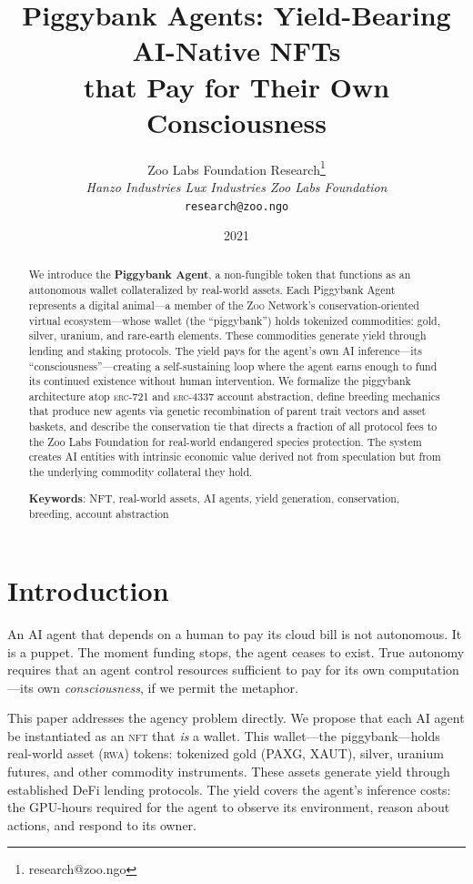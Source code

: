 \documentclass[11pt,letterpaper]{article}
\title{\textbf{Piggybank Agents: Yield-Bearing AI-Native NFTs\\that Pay for Their Own Consciousness}}
\author{
Zoo Labs Foundation Research\thanks{research@zoo.ngo}\\
\textit{Hanzo Industries \quad Lux Industries \quad Zoo Labs Foundation}\\
\texttt{research@zoo.ngo}
}
\date{2021}
\newcommand{\Zoo}{\textsc{Zoo}}
\newcommand{\NFT}{\textsc{nft}}
\newcommand{\ERC}{\textsc{erc}}
\newcommand{\RWA}{\textsc{rwa}}
\begin{document}
\zoocoverpage

\begin{abstract}
We introduce the \textbf{Piggybank Agent}, a non-fungible token that functions as an autonomous wallet collateralized by real-world assets. Each Piggybank Agent represents a digital animal---a member of the \Zoo{} Network's conservation-oriented virtual ecosystem---whose wallet (the ``piggybank'') holds tokenized commodities: gold, silver, uranium, and rare-earth elements. These commodities generate yield through lending and staking protocols. The yield pays for the agent's own AI inference---its ``consciousness''---creating a self-sustaining loop where the agent earns enough to fund its continued existence without human intervention. We formalize the piggybank architecture atop \ERC{}-721 and \ERC{}-4337 account abstraction, define breeding mechanics that produce new agents via genetic recombination of parent trait vectors and asset baskets, and describe the conservation tie that directs a fraction of all protocol fees to the Zoo Labs Foundation for real-world endangered species protection. The system creates AI entities with intrinsic economic value derived not from speculation but from the underlying commodity collateral they hold.

\textbf{Keywords}: NFT, real-world assets, AI agents, yield generation, conservation, breeding, account abstraction
\end{abstract}

\section{Introduction}
\label{sec:intro}

An AI agent that depends on a human to pay its cloud bill is not autonomous. It is a puppet. The moment funding stops, the agent ceases to exist. True autonomy requires that an agent control resources sufficient to pay for its own computation---its own \emph{consciousness}, if we permit the metaphor.

This paper addresses the agency problem directly. We propose that each AI agent be instantiated as an \NFT{} that \emph{is} a wallet. This wallet---the piggybank---holds real-world asset (\RWA{}) tokens: tokenized gold (PAXG, XAUT), silver, uranium futures, and other commodity instruments. These assets generate yield through established DeFi lending protocols. The yield covers the agent's inference costs: the GPU-hours required for the agent to observe its environment, reason about actions, and respond to its owner.
\end{document}
